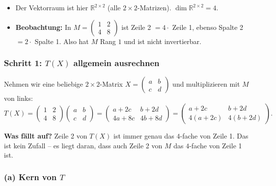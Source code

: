 \documentclass[a4paper,12pt]{article}
\begin{document}
\begin{begriffe}
\begin{itemize}[leftmargin=*, nosep]
    \item Der Vektorraum ist hier $\mathbb{R}^{2 \times 2}$ (alle $2\times 2$-Matrizen). $\dim \mathbb{R}^{2\times 2} = 4$.
    \item \textbf{Beobachtung:} In $M = \begin{pmatrix} 1 & 2 \\ 4 & 8 \end{pmatrix}$ ist Zeile 2 $= 4 \cdot$ Zeile 1, ebenso Spalte 2 $= 2 \cdot$ Spalte 1. Also hat $M$ Rang $1$ und ist nicht invertierbar.
\end{itemize}
\end{begriffe}

\subsubsection*{Schritt 1: $T(X)$ allgemein ausrechnen}

Nehmen wir eine beliebige $2\times 2$-Matrix $X = \begin{pmatrix} a & b \\ c & d \end{pmatrix}$ und multiplizieren mit $M$ von links:
\[
T(X) = \begin{pmatrix} 1 & 2 \\ 4 & 8 \end{pmatrix} \begin{pmatrix} a & b \\ c & d \end{pmatrix}
= \begin{pmatrix} a + 2c & b + 2d \\ 4a + 8c & 4b + 8d \end{pmatrix}
= \begin{pmatrix} a + 2c & b + 2d \\ 4(a + 2c) & 4(b + 2d) \end{pmatrix}.
\]

\textbf{Was f\"allt auf?} Zeile 2 von $T(X)$ ist immer genau das $4$-fache von Zeile 1. Das ist kein Zufall -- es liegt daran, dass auch Zeile 2 von $M$ das $4$-fache von Zeile 1 ist.

\subsubsection*{(a) Kern von $T$}
\end{document}
